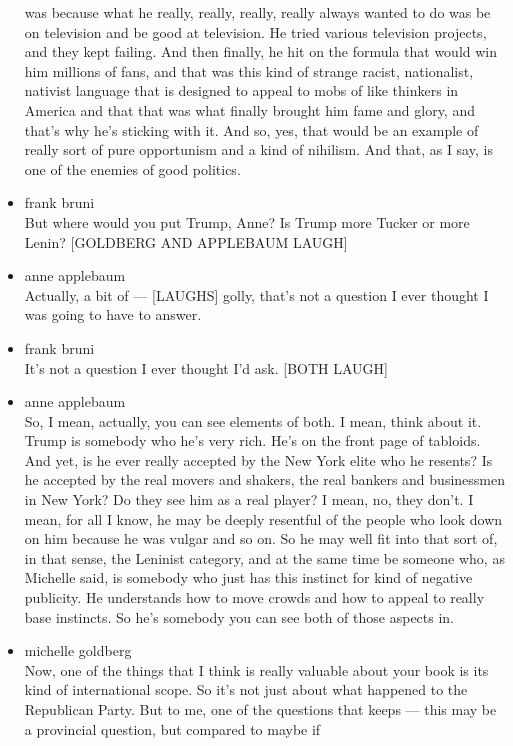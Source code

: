 \begin{itemize}
  was because what he really, really, really, really always wanted to do
  was be on television and be good at television. He tried various
  television projects, and they kept failing. And then finally, he hit
  on the formula that would win him millions of fans, and that was this
  kind of strange racist, nationalist, nativist language that is
  designed to appeal to mobs of like thinkers in America and that that
  was what finally brought him fame and glory, and that's why he's
  sticking with it. And so, yes, that would be an example of really sort
  of pure opportunism and a kind of nihilism. And that, as I say, is one
  of the enemies of good politics.
\item
  frank bruni\\
  But where would you put Trump, Anne? Is Trump more Tucker or more
  Lenin? {[}GOLDBERG AND APPLEBAUM LAUGH{]}
\item
  anne applebaum\\
  Actually, a bit of --- {[}LAUGHS{]} golly, that's not a question I
  ever thought I was going to have to answer.
\item
  frank bruni\\
  It's not a question I ever thought I'd ask. {[}BOTH LAUGH{]}
\item
  anne applebaum\\
  So, I mean, actually, you can see elements of both. I mean, think
  about it. Trump is somebody who he's very rich. He's on the front page
  of tabloids. And yet, is he ever really accepted by the New York elite
  who he resents? Is he accepted by the real movers and shakers, the
  real bankers and businessmen in New York? Do they see him as a real
  player? I mean, no, they don't. I mean, for all I know, he may be
  deeply resentful of the people who look down on him because he was
  vulgar and so on. So he may well fit into that sort of, in that sense,
  the Leninist category, and at the same time be someone who, as
  Michelle said, is somebody who just has this instinct for kind of
  negative publicity. He understands how to move crowds and how to
  appeal to really base instincts. So he's somebody you can see both of
  those aspects in.
\item
  michelle goldberg\\
  Now, one of the things that I think is really valuable about your book
  is its kind of international scope. So it's not just about what
  happened to the Republican Party. But to me, one of the questions that
  keeps --- this may be a provincial question, but compared to maybe if

\end{itemize}
